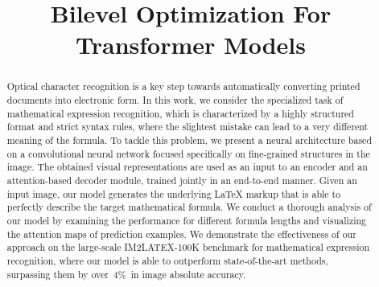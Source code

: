 \documentclass[conference]{IEEEtran}
\begin{document}
\title{Bilevel Optimization For Transformer Models}

 \author{}


\maketitle


\newcommand{\etal}{\textit{et al}.}
\newcommand{\ie}{\textit{i}.\textit{e}.~}
\newcommand{\eg}{\textit{e}.\textit{g}.~}

\newcommand{\mypar}[1]{\vspace{0.3cm}\noindent\textbf{#1}}

\newcommand{\red}[1]{\textcolor{red}{#1}}
\newcommand{\green}[1]{\textcolor{green}{#1}}
\begin{abstract}
Optical character recognition is a key step towards automatically converting printed documents into electronic form. 
In this work, we consider the specialized task of mathematical expression recognition, which is characterized by a highly structured format and strict syntax rules, where the slightest mistake can lead to a very different meaning of the formula.  
To tackle this problem, we present a neural architecture based on a convolutional neural network focused specifically on fine-grained structures in the image.
The obtained visual representations are used as an input to an encoder and an attention-based decoder module, trained jointly in an end-to-end manner.
Given an input image, our model generates the underlying LaTeX markup that is able to perfectly describe the target mathematical formula.
We conduct a thorough analysis of our model by examining the performance for different formula lengths and visualizing the attention maps of prediction examples.
We demonstrate the effectiveness of our approach on the large-scale IM2LATEX-100K benchmark for mathematical expression recognition, where our model is able to outperform state-of-the-art methods, surpassing them by over~4\%~in image absolute accuracy.
\end{abstract}
\end{document}
